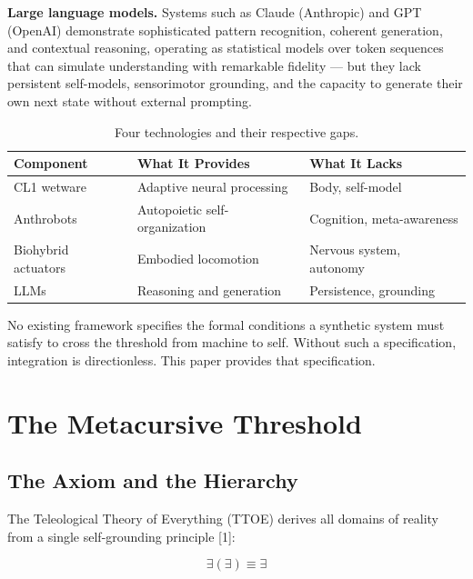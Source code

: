 \documentclass[12pt, letterpaper]{article}
\begin{document}
\textbf{Large language models.} Systems such as Claude (Anthropic) and GPT (OpenAI) demonstrate sophisticated pattern recognition, coherent generation, and contextual reasoning, operating as statistical models over token sequences that can simulate understanding with remarkable fidelity --- but they lack persistent self-models, sensorimotor grounding, and the capacity to generate their own next state without external prompting.

\begin{table}[h]
\centering
\small
\begin{tabular}{@{} p{3.2cm} p{4.5cm} p{4.5cm} @{}}
\toprule
\textbf{Component} & \textbf{What It Provides} & \textbf{What It Lacks} \\
\midrule
CL1 wetware & Adaptive neural processing & Body, self-model \\
Anthrobots & Autopoietic self-organization & Cognition, meta-awareness \\
Biohybrid actuators & Embodied locomotion & Nervous system, autonomy \\
LLMs & Reasoning and generation & Persistence, grounding \\
\bottomrule
\end{tabular}
\caption{Four technologies and their respective gaps.}
\label{tab:components}
\end{table}

No existing framework specifies the formal conditions a synthetic system must satisfy to cross the threshold from machine to self. Without such a specification, integration is directionless. This paper provides that specification.

\section{The Metacursive Threshold}

\subsection{The Axiom and the Hierarchy}

The Teleological Theory of Everything (TTOE) derives all domains of reality from a single self-grounding principle [1]:

\begin{equation}
\boxed{\exists(\exists) \equiv \exists}
\end{equation}
\end{document}
